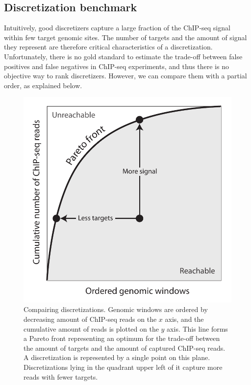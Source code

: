 \documentclass{bioinfo}
\begin{document}
\subsection{Discretization benchmark}
Intuitively, good discretizers capture a large fraction of the
ChIP-seq signal within few target genomic sites. The number of targets
and the amount of signal they represent are therefore critical
characteristics of a discretization. Unfortunately, there is no gold
standard to estimate the trade-off between false positives and false
negatives in ChIP-seq experiments, and thus there is no objective way
to rank discretizers. However, we can compare them with a partial order,
as explained below.

\begin{figure}[!tpb]
\centerline{\includegraphics[scale=0.5]{pareto_front_explanation.pdf}}
\caption{Compairing discretizations. Genomic windows are ordered by
decreasing amount of ChIP-seq reads on the $x$ axis, and the
cumulative amount of reads is plotted on the $y$ axis. This line forms
a Pareto front representing an optimum for the trade-off between
the amount of targets and the amount of captured ChIP-seq reads. A
discretization is represented by a single point on this plane.
Discretizations lying in the quadrant upper left of it capture more
reads with fewer targets.}
\label{fig:expl}
\end{figure}
\end{document}
